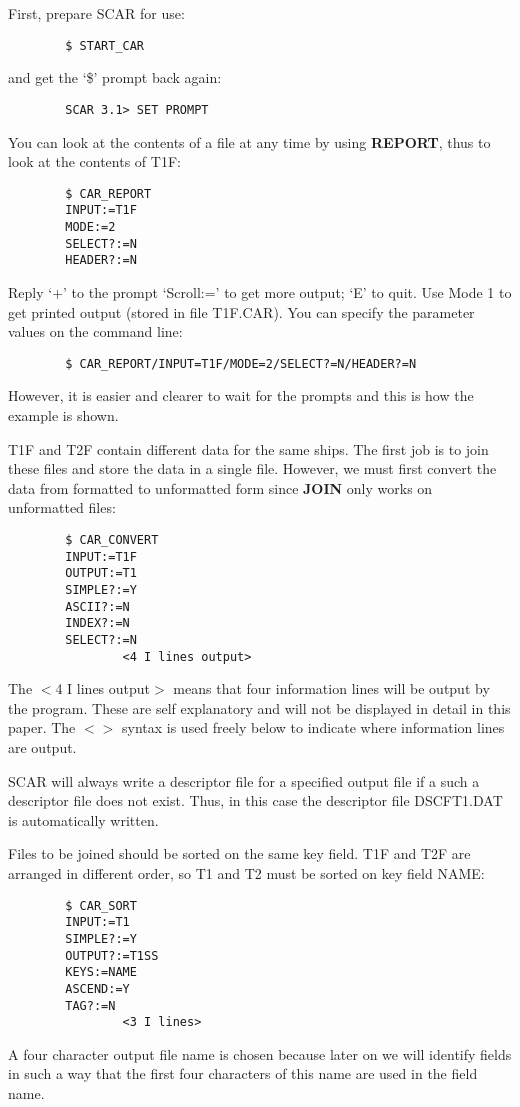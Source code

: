 First, prepare SCAR for use:
\begin{verbatim}
        $ START_CAR
\end{verbatim}
and get the `\$' prompt back again:
\begin{verbatim}
        SCAR 3.1> SET PROMPT
\end{verbatim}
You can look at the contents of a file at any time by using {\bf REPORT},
thus to look at the contents of T1F:
\begin{verbatim}
        $ CAR_REPORT
        INPUT:=T1F
        MODE:=2
        SELECT?:=N
        HEADER?:=N
\end{verbatim}
Reply `+' to the prompt `Scroll:=' to get more output; `E' to quit.
Use Mode 1 to get printed output (stored in file T1F.CAR).
You can specify the parameter values on the command line:
\begin{verbatim}
        $ CAR_REPORT/INPUT=T1F/MODE=2/SELECT?=N/HEADER?=N
\end{verbatim}
However, it is easier and clearer to wait for the prompts and this is how the
example is shown.

T1F and T2F contain different data for the same ships.
The first job is to join these files and store the data in a single file.
However, we must first convert the data from formatted to unformatted form
since {\bf JOIN} only works on unformatted files:
\begin{verbatim}
        $ CAR_CONVERT
        INPUT:=T1F
        OUTPUT:=T1
        SIMPLE?:=Y
        ASCII?:=N
        INDEX?:=N
        SELECT?:=N
                <4 I lines output>
\end{verbatim}
The $<$4 I lines output$>$ means that four information lines will be output by
the program.
These are self explanatory and will not be displayed in detail in this paper.
The $<>$ syntax is used freely below to indicate where information lines are
output.

SCAR will always write a descriptor file for a specified output file if a such
a descriptor file does not exist.
Thus, in this case the descriptor file DSCFT1.DAT is automatically written.

Files to be joined should be sorted on the same key field.
T1F and T2F are arranged in different order, so T1 and T2 must be sorted on key
field NAME:
\begin{verbatim}
        $ CAR_SORT
        INPUT:=T1
        SIMPLE?:=Y
        OUTPUT?:=T1SS
        KEYS:=NAME
        ASCEND:=Y
        TAG?:=N
                <3 I lines>
\end{verbatim}
A four character output file name is chosen because later on we will identify
fields in such a way that the first four characters of this name are used in the
field name.

